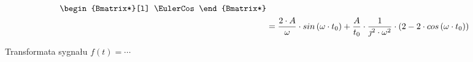 \begin{task}
\begin{align*}
\begin{Bmatrix*}[l]
\EulerCos
\end{Bmatrix*}\\
&= \frac{2\cdot A}{\omega}\cdot sin\left(\omega \cdot t_{0}\right) + \frac{A}{t_{0}}\cdot \frac{1}{\jmath^{2} \cdot \omega^{2}} \cdot \left(2  - 2\cdot cos \left( \omega \cdot t_{0}\right)\right)\\
\end{align*}

Transformata sygnału $f(t) =\cdots$

\end{task}

